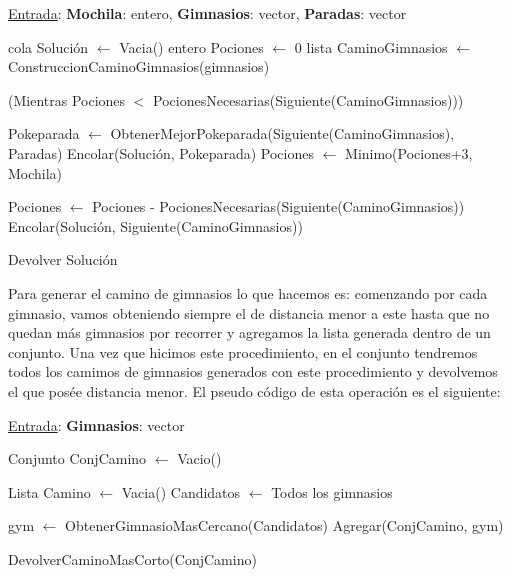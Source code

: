 \begin{algorithm}[H]
\label{}
\caption{}
\begin{algorithmic}[1]
\Statex \underline{Entrada}: \textbf{Mochila}: entero, \textbf{Gimnasios}: vector, \textbf{Paradas}: vector

\State cola Solución $\leftarrow$ Vacia()
\State entero Pociones $\leftarrow$ 0
\State lista CaminoGimnasios $\leftarrow$ ConstruccionCaminoGimnasios(gimnasios)


	\While(Mientras Pociones $<$ PocionesNecesarias(Siguiente(CaminoGimnasios)))

		\State Pokeparada $\leftarrow$ ObtenerMejorPokeparada(Siguiente(CaminoGimnasios), Paradas)
		\State Encolar(Solución, Pokeparada)
		\State Pociones $\leftarrow$ Minimo(Pociones+3, Mochila)

	\EndWhile

	\State Pociones $\leftarrow$ Pociones - PocionesNecesarias(Siguiente(CaminoGimnasios))
	Encolar(Solución, Siguiente(CaminoGimnasios))

\EndWhile

\State Devolver Solución

\medskip
\Statex \underline{}
\end{algorithmic}
\end{algorithm}

Para generar el camino de gimnasios lo que hacemos es: comenzando por cada gimnasio, vamos obteniendo siempre el de distancia menor a este hasta que no quedan más gimnasios por recorrer y agregamos la lista generada dentro de un conjunto. Una vez que hicimos este procedimiento, en el conjunto tendremos todos los camimos de gimnasios generados con este procedimiento y devolvemos el que posée distancia menor. El pseudo código de esta operación es el siguiente:

\begin{algorithm}[H]
\label{}
\caption{}
\begin{algorithmic}
\Statex \underline{Entrada}: \textbf{Gimnasios}: vector

\State Conjunto ConjCamino $\leftarrow$ Vacio()


	\State Lista Camino $\leftarrow$ Vacia()
	\State Candidatos $\leftarrow$ Todos los gimnasios

		\State gym $\leftarrow$ ObtenerGimnasioMasCercano(Candidatos)
		Agregar(ConjCamino, gym)

	\EndWhile

\EndFor

\State DevolverCaminoMasCorto(ConjCamino)

\medskip
\Statex \underline{}
\end{algorithmic}
\end{algorithm}



